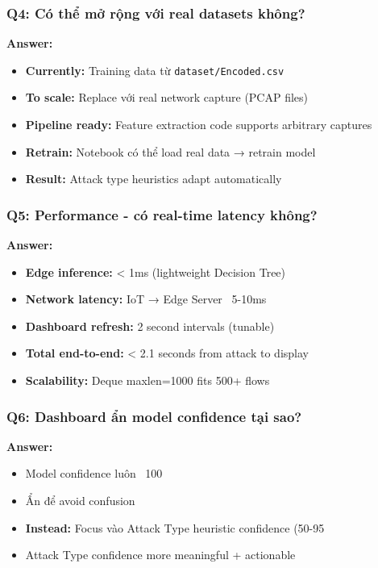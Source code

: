 \documentclass[12pt,a4paper]{article}
\begin{document}
\subsubsection{Q4: Có thể mở rộng với real datasets không?}

\textbf{Answer:}
\begin{itemize}
    \item \textbf{Currently:} Training data từ \texttt{dataset/Encoded.csv}
    \item \textbf{To scale:} Replace với real network capture (PCAP files)
    \item \textbf{Pipeline ready:} Feature extraction code supports arbitrary captures
    \item \textbf{Retrain:} Notebook có thể load real data → retrain model
    \item \textbf{Result:} Attack type heuristics adapt automatically
\end{itemize}

\subsubsection{Q5: Performance - có real-time latency không?}

\textbf{Answer:}
\begin{itemize}
    \item \textbf{Edge inference:} < 1ms (lightweight Decision Tree)
    \item \textbf{Network latency:} IoT → Edge Server ~5-10ms
    \item \textbf{Dashboard refresh:} 2 second intervals (tunable)
    \item \textbf{Total end-to-end:} < 2.1 seconds from attack to display
    \item \textbf{Scalability:} Deque maxlen=1000 fits 500+ flows
\end{itemize}

\subsubsection{Q6: Dashboard ẩn model confidence tại sao?}

\textbf{Answer:}
\begin{itemize}
    \item Model confidence luôn ~100%
    \item Ẩn để avoid confusion
    \item \textbf{Instead:} Focus vào Attack Type heuristic confidence (50-95%
    \item Attack Type confidence more meaningful + actionable
\end{itemize}
\end{document}
